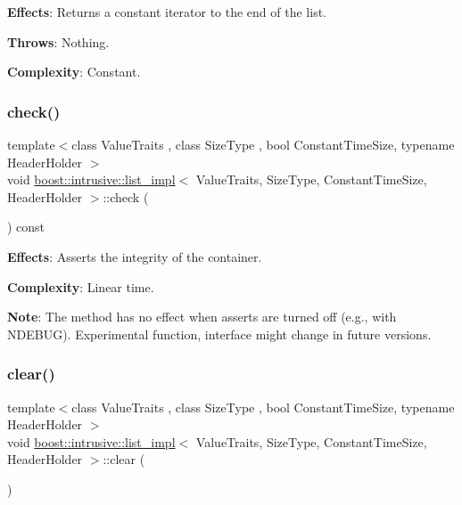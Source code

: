 {\bfseries Effects}\+: Returns a constant iterator to the end of the list.

{\bfseries Throws}\+: Nothing.

{\bfseries Complexity}\+: Constant. \mbox{\label{classboost_1_1intrusive_1_1list__impl_a7ae0ab138848f3a6fbe7da6f44617a75}} 
\subsubsection{\texorpdfstring{check()}{check()}}
{\footnotesize\ttfamily template$<$class Value\+Traits , class Size\+Type , bool Constant\+Time\+Size, typename Header\+Holder $>$ \\
void \hyperlink{classboost_1_1intrusive_1_1list__impl}{boost\+::intrusive\+::list\+\_\+impl}$<$ Value\+Traits, Size\+Type, Constant\+Time\+Size, Header\+Holder $>$\+::check (\begin{DoxyParamCaption}{ }\end{DoxyParamCaption}) const\hspace{0.3cm}{\ttfamily [inline]}}

{\bfseries Effects}\+: Asserts the integrity of the container.

{\bfseries Complexity}\+: Linear time.

{\bfseries Note}\+: The method has no effect when asserts are turned off (e.\+g., with N\+D\+E\+B\+UG). Experimental function, interface might change in future versions. \mbox{\label{classboost_1_1intrusive_1_1list__impl_a5666d7343a0e7bad0ad0f1869c90e1b2}} 
\subsubsection{\texorpdfstring{clear()}{clear()}}
{\footnotesize\ttfamily template$<$class Value\+Traits , class Size\+Type , bool Constant\+Time\+Size, typename Header\+Holder $>$ \\
void \hyperlink{classboost_1_1intrusive_1_1list__impl}{boost\+::intrusive\+::list\+\_\+impl}$<$ Value\+Traits, Size\+Type, Constant\+Time\+Size, Header\+Holder $>$\+::clear (\begin{DoxyParamCaption}{ }\end{DoxyParamCaption})\hspace{0.3cm}{\ttfamily [inline]}}

